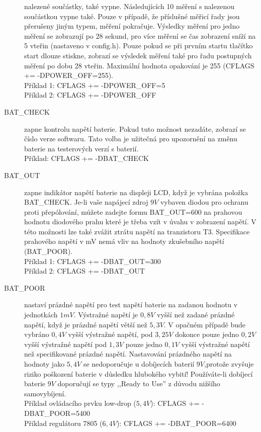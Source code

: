 \begin{description}
nalezené součástky, také vypne.
Následujících 10 měření s nalezenou součástkou vypne také.
Pouze v případě, že příslušné měřicí řady jsou přerušeny jiným typem, měření pokračuje.
Výsledky měření pro jedno měření se zobrazují po 28 sekund, pro více měření se
čas zobrazení sníží na 5 vteřin (nastaveno v config.h).
Pouze pokud se při prvním startu tlačítko start dlouze stiskne, zobrazí se výsledek měření
také pro řadu postupných měření po dobu 28 vteřin.
Maximální hodnota opakování je 255 (CFLAGS += -DPOWER\_OFF=255).\\
Příklad 1: CFLAGS += -DPOWER\_OFF=5 \\
Příklad 2: CFLAGS += -DPOWER\_OFF 
  \item[BAT\_CHECK] zapne kontrolu napětí baterie.
  Pokud tuto možnost nezadáte, zobrazí se číslo verze softwaru.
Tato volba je užitečná pro upozornění na změnu baterie na testerových verzí s baterií.\\
Příklad: CFLAGS += -DBAT\_CHECK
  \item[BAT\_OUT] zapne indikátor napětí baterie na displeji LCD, když je vybrána položka BAT\_CHECK.
 Je-li vaše napájecí zdroj \(9V\)  vybaven diodou pro ochranu proti přepólování, můžete
zadejte formu BAT\_OUT=600 na prahovou hodnotu diodového prahu
které je třeba vzít v úvahu v zobrazení napětí.
V této možnosti lze také zvážit ztrátu napětí na tranzistoru T3.
Specifikace prahového napětí v mV nemá vliv na hodnoty zkušebního napětí (BAT\_POOR).\\
Příklad 1: CFLAGS += -DBAT\_OUT=300 \\
Příklad 2: CFLAGS += -DBAT\_OUT
  \item[BAT\_POOR]  nastaví prázdné napětí pro test napětí baterie na zadanou hodnotu v jednotkách \(1mV\).
Výstražné napětí je \(0,8V\) vyšší než zadané prázdné napětí, když je prázdné napětí větší než \(5,3V\).
V opačném případě bude vybráno \(0,4V\) vyšší výstražné napětí,
pod \(3,25V\) dokonce pouze jedno \(0,2V\) vyšší výstražné napětí pod \(1,3V\) pouze
jedno \(0,1V\) vyšší výstražné napětí než specifikované prázdné napětí.
Nastavování prázdného napětí na hodnoty jako \(5,4V\) se nedoporučuje u dobíjecích
baterií \(9V\),protože zvyšuje riziko poškození baterie v důsledku hlubokého vybití!
Používáte-li dobíjecí baterie \(9V\) doporučují se typy ,,Ready to Use'' z důvodu nižšího samovybíjení.\\
Příklad ovládacího prvku low-drop (\(5,4V\)): CFLAGS += -DBAT\_POOR=5400 \\
Příklad regulátoru 7805 (\(6,4V\)): CFLAGS += -DBAT\_POOR=6400

\end{description}
